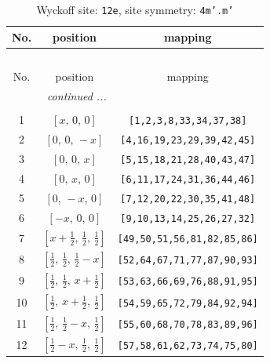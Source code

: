 \documentclass[fleqn,8pt]{jsarticle}
\begin{document}
\begin{longtable}{ccc}
\caption{Wyckoff site: {\tt 12e}, site symmetry: {\tt 4m'.m'}}
 \\
 \hline \hline
No. & position & mapping \\ \hline \endfirsthead

\multicolumn{2}{l}{\tablename\ \thetable{}} \\
 \hline \hline
No. & position & mapping \\ \hline \endhead

 \hline \hline
\multicolumn{2}{r}{\footnotesize\it continued ...} \\ \endfoot

 \hline \hline
\multicolumn{2}{r}{} \\ \endlastfoot

1 & $\left[ x,\, 0,\, 0 \right]$ & {\tt [1,2,3,8,33,34,37,38]} \\ \hline
2 & $\left[ 0,\, 0,\, - x \right]$ & {\tt [4,16,19,23,29,39,42,45]} \\ \hline
3 & $\left[ 0,\, 0,\, x \right]$ & {\tt [5,15,18,21,28,40,43,47]} \\ \hline
4 & $\left[ 0,\, x,\, 0 \right]$ & {\tt [6,11,17,24,31,36,44,46]} \\ \hline
5 & $\left[ 0,\, - x,\, 0 \right]$ & {\tt [7,12,20,22,30,35,41,48]} \\ \hline
6 & $\left[ - x,\, 0,\, 0 \right]$ & {\tt [9,10,13,14,25,26,27,32]} \\ \hline
7 & $\left[ x + \frac{1}{2},\, \frac{1}{2},\, \frac{1}{2} \right]$ & {\tt [49,50,51,56,81,82,85,86]} \\ \hline
8 & $\left[ \frac{1}{2},\, \frac{1}{2},\, \frac{1}{2} - x \right]$ & {\tt [52,64,67,71,77,87,90,93]} \\ \hline
9 & $\left[ \frac{1}{2},\, \frac{1}{2},\, x + \frac{1}{2} \right]$ & {\tt [53,63,66,69,76,88,91,95]} \\ \hline
10 & $\left[ \frac{1}{2},\, x + \frac{1}{2},\, \frac{1}{2} \right]$ & {\tt [54,59,65,72,79,84,92,94]} \\ \hline
11 & $\left[ \frac{1}{2},\, \frac{1}{2} - x,\, \frac{1}{2} \right]$ & {\tt [55,60,68,70,78,83,89,96]} \\ \hline
12 & $\left[ \frac{1}{2} - x,\, \frac{1}{2},\, \frac{1}{2} \right]$ & {\tt [57,58,61,62,73,74,75,80]} \\
\end{longtable}
\renewcommand{\arraystretch}{1.2}
\end{document}

